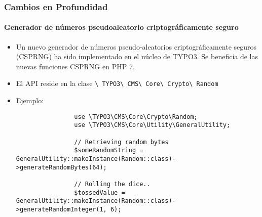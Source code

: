 \begin{frame}[fragile]
	\frametitle{Cambios en Profundidad}
	\framesubtitle{Generador de números pseudoaleatorio criptográficamente seguro}

	\lstset{basicstyle=\tiny\ttfamily}

	\begin{itemize}

		\item Un nuevo generador de números pseudo-aleatorios criptográficamente seguros (CSPRNG) ha sido
			implementado en el núcleo de TYPO3.\newline
			Se beneficia de las nuevas funciones CSPRNG en PHP 7.

		\item El API reside en la clase
			\texttt{\textbackslash
				TYPO3\textbackslash
				CMS\textbackslash
				Core\textbackslash
				Crypto\textbackslash
				Random}

		\item Ejemplo:

			\begin{lstlisting}
				use \TYPO3\CMS\Core\Crypto\Random;
				use \TYPO3\CMS\Core\Utility\GeneralUtility;

				// Retrieving random bytes
				$someRandomString = GeneralUtility::makeInstance(Random::class)->generateRandomBytes(64);

				// Rolling the dice..
				$tossedValue = GeneralUtility::makeInstance(Random::class)->generateRandomInteger(1, 6);
			\end{lstlisting}

	\end{itemize}

\end{frame}

